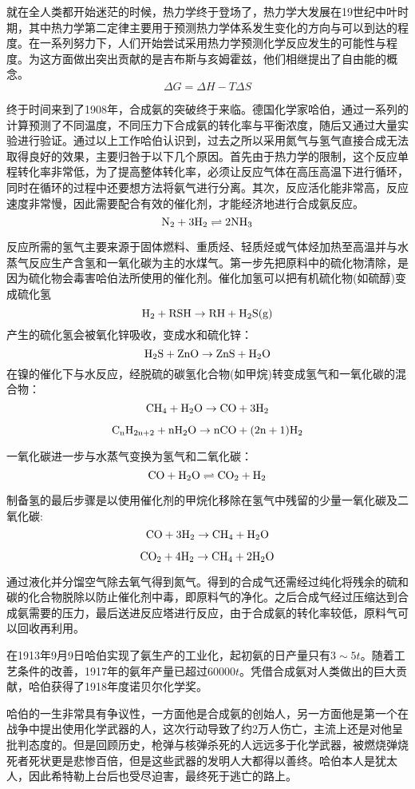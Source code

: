 \documentclass[a4paper,12pt]{article}
\begin{document}
就在全人类都开始迷茫的时候，热力学终于登场了，热力学大发展在19世纪中叶时期，其中热力学第二定律主要用于预测热力学体系发生变化的方向与可以到达的程度。在一系列努力下，人们开始尝试采用热力学预测化学反应发生的可能性与程度。为这方面做出突出贡献的是吉布斯与亥姆霍兹，他们相继提出了自由能的概念。
$$
\Delta G=\Delta H-T\Delta S
$$

终于时间来到了1908年，合成氨的突破终于来临。德国化学家哈伯，通过一系列的计算预测了不同温度，不同压力下合成氨的转化率与平衡浓度，随后又通过大量实验进行验证。通过以上工作哈伯认识到，过去之所以采用氮气与氢气直接合成无法取得良好的效果，主要归咎于以下几个原因。首先由于热力学的限制，这个反应单程转化率非常低，为了提高整体转化率，必须让反应气体在高压高温下进行循环，同时在循环的过程中还要想方法将氨气进行分离。其次，反应活化能非常高，反应速度非常慢，因此需要配合有效的催化剂，才能经济地进行合成氨反应。
$$
\rm N_2 +3H_2\rightleftharpoons  2NH_3
$$

反应所需的氢气主要来源于固体燃料、重质烃、轻质烃或气体烃加热至高温并与水蒸气反应生产含氢和一氧化碳为主的水煤气。第一步先把原料中的硫化物清除，是因为硫化物会毒害哈伯法所使用的催化剂。催化加氢可以把有机硫化物(如硫醇)变成硫化氢
$$
\rm H_2+ RSH \rightarrow RH + H_2S(g)
$$
产生的硫化氢会被氧化锌吸收，变成水和硫化锌：
$$
\rm H_2S+ZnO\rightarrow ZnS+H_2O
$$
在镍的催化下与水反应，经脱硫的碳氢化合物(如甲烷)转变成氢气和一氧化碳的混合物：
$$
\rm CH_4+ H_2O \rightarrow CO + 3 H_2
$$

$$
\rm C_nH_{2n+2}+nH_2O\rightarrow nCO+(2n+1)H_2
$$

一氧化碳进一步与水蒸气变换为氢气和二氧化碳：
$$
\rm CO + H_2O \rightleftharpoons CO_2+ H_2
$$

制备氢的最后步骤是以使用催化剂的甲烷化移除在氢气中残留的少量一氧化碳及二氧化碳:
$$
\rm CO+3H_2\rightarrow CH_4+H_2O
$$

$$
\rm CO_2+4H_2\rightarrow CH_4+2H_2O
$$

通过液化并分馏空气除去氧气得到氮气。得到的合成气还需经过纯化将残余的硫和碳的化合物脱除以防止催化剂中毒，即原料气的净化。之后合成气经过压缩达到合成氨需要的压力，最后送进反应塔进行反应，由于合成氨的转化率较低，原料气可以回收再利用。

在1913年9月9日哈伯实现了氨生产的工业化，起初氨的日产量只有$3\sim5t$。随着工艺条件的改善，1917年的氨年产量已超过$60000t$。凭借合成氨对人类做出的巨大贡献，哈伯获得了1918年度诺贝尔化学奖。

哈伯的一生非常具有争议性，一方面他是合成氨的创始人，另一方面他是第一个在战争中提出使用化学武器的人，这次行动导致了约2万人伤亡，主流上还是对他呈批判态度的。但是回顾历史，枪弹与核弹杀死的人远远多于化学武器，被燃烧弹烧死者死状更是悲惨百倍，但是这些武器的发明人大都得以善终。哈伯本人是犹太人，因此希特勒上台后也受尽迫害，最终死于逃亡的路上。
\end{document}
